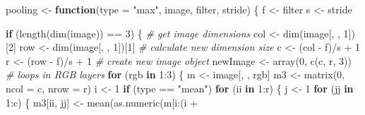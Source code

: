 \documentclass[
  12pt,
]{krantz}
\makeatletter
\newenvironment{Shaded}{\begin{snugshade}}{\end{snugshade}}
\newcommand{\AttributeTok}[1]{\textcolor[rgb]{0.61,0.61,0.61}{#1}}
\newcommand{\CommentTok}[1]{\textcolor[rgb]{0.37,0.37,0.37}{\textit{#1}}}
\newcommand{\ControlFlowTok}[1]{\textcolor[rgb]{0.27,0.27,0.27}{\textbf{#1}}}
\newcommand{\DecValTok}[1]{\textcolor[rgb]{0.06,0.06,0.06}{#1}}
\newcommand{\FunctionTok}[1]{\textcolor[rgb]{0,0,0}{#1}}
\newcommand{\NormalTok}[1]{#1}
\newcommand{\OtherTok}[1]{\textcolor[rgb]{0.37,0.37,0.37}{#1}}
\newcommand{\SpecialCharTok}[1]{\textcolor[rgb]{0,0,0}{#1}}
\newcommand{\StringTok}[1]{\textcolor[rgb]{0.5,0.5,0.5}{#1}}
\newenvironment{kframe}{%
\medskip{}
\setlength{\fboxsep}{.8em}
 \def\at@end@of@kframe{}%
 \ifinner\ifhmode%
  \def\at@end@of@kframe{\end{minipage}}%
  \begin{minipage}{\columnwidth}%
 \fi\fi%
 \def\FrameCommand##1{\hskip\@totalleftmargin \hskip-\fboxsep
 \colorbox{shadecolor}{##1}\hskip-\fboxsep
     \hskip-\linewidth \hskip-\@totalleftmargin \hskip\columnwidth}%
 \MakeFramed {\advance\hsize-\width
   \@totalleftmargin\z@ \linewidth\hsize
   \@setminipage}}%
 {\par\unskip\endMakeFramed%
 \at@end@of@kframe}
\renewenvironment{Shaded}{\begin{kframe}}{\end{kframe}}
\makeatother
\begin{document}
\begin{Shaded}
\begin{Highlighting}[]
\NormalTok{pooling }\OtherTok{\textless{}{-}} \ControlFlowTok{function}\NormalTok{(}\AttributeTok{type =} \StringTok{"max"}\NormalTok{, image, filter, stride) \{}
\NormalTok{    f }\OtherTok{\textless{}{-}}\NormalTok{ filter}
\NormalTok{    s }\OtherTok{\textless{}{-}}\NormalTok{ stride}

    \ControlFlowTok{if}\NormalTok{ (}\FunctionTok{length}\NormalTok{(}\FunctionTok{dim}\NormalTok{(image)) }\SpecialCharTok{==} \DecValTok{3}\NormalTok{) \{}
        \CommentTok{\# get image dimensions}
\NormalTok{        col }\OtherTok{\textless{}{-}} \FunctionTok{dim}\NormalTok{(image[, , }\DecValTok{1}\NormalTok{])[}\DecValTok{2}\NormalTok{]}
\NormalTok{        row }\OtherTok{\textless{}{-}} \FunctionTok{dim}\NormalTok{(image[, , }\DecValTok{1}\NormalTok{])[}\DecValTok{1}\NormalTok{]}
        \CommentTok{\# calculate new dimension size}
\NormalTok{        c }\OtherTok{\textless{}{-}}\NormalTok{ (col }\SpecialCharTok{{-}}\NormalTok{ f)}\SpecialCharTok{/}\NormalTok{s }\SpecialCharTok{+} \DecValTok{1}
\NormalTok{        r }\OtherTok{\textless{}{-}}\NormalTok{ (row }\SpecialCharTok{{-}}\NormalTok{ f)}\SpecialCharTok{/}\NormalTok{s }\SpecialCharTok{+} \DecValTok{1}
        \CommentTok{\# create new image object}
\NormalTok{        newImage }\OtherTok{\textless{}{-}} \FunctionTok{array}\NormalTok{(}\DecValTok{0}\NormalTok{, }\FunctionTok{c}\NormalTok{(c, r, }\DecValTok{3}\NormalTok{))}
        \CommentTok{\# loops in RGB layers}
        \ControlFlowTok{for}\NormalTok{ (rgb }\ControlFlowTok{in} \DecValTok{1}\SpecialCharTok{:}\DecValTok{3}\NormalTok{) \{}
\NormalTok{            m }\OtherTok{\textless{}{-}}\NormalTok{ image[, , rgb]}
\NormalTok{            m3 }\OtherTok{\textless{}{-}} \FunctionTok{matrix}\NormalTok{(}\DecValTok{0}\NormalTok{, }\AttributeTok{ncol =}\NormalTok{ c, }\AttributeTok{nrow =}\NormalTok{ r)}
\NormalTok{            i }\OtherTok{\textless{}{-}} \DecValTok{1}
            \ControlFlowTok{if}\NormalTok{ (type }\SpecialCharTok{==} \StringTok{"mean"}\NormalTok{)}
                \ControlFlowTok{for}\NormalTok{ (ii }\ControlFlowTok{in} \DecValTok{1}\SpecialCharTok{:}\NormalTok{r) \{}
\NormalTok{                  j }\OtherTok{\textless{}{-}} \DecValTok{1}
                  \ControlFlowTok{for}\NormalTok{ (jj }\ControlFlowTok{in} \DecValTok{1}\SpecialCharTok{:}\NormalTok{c) \{}
\NormalTok{                    m3[ii, jj] }\OtherTok{\textless{}{-}} \FunctionTok{mean}\NormalTok{(}\FunctionTok{as.numeric}\NormalTok{(m[i}\SpecialCharTok{:}\NormalTok{(i }\SpecialCharTok{+}

\end{Highlighting}
\end{Shaded}
\end{document}
